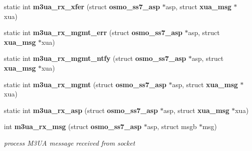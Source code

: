 \begin{DoxyCompactItemize}
\item 
static int {\bf m3ua\+\_\+rx\+\_\+xfer} (struct {\bf osmo\+\_\+ss7\+\_\+asp} $\ast$asp, struct {\bf xua\+\_\+msg} $\ast$xua)
\item 
static int {\bf m3ua\+\_\+rx\+\_\+mgmt\+\_\+err} (struct {\bf osmo\+\_\+ss7\+\_\+asp} $\ast$asp, struct {\bf xua\+\_\+msg} $\ast$xua)
\item 
static int {\bf m3ua\+\_\+rx\+\_\+mgmt\+\_\+ntfy} (struct {\bf osmo\+\_\+ss7\+\_\+asp} $\ast$asp, struct {\bf xua\+\_\+msg} $\ast$xua)
\item 
static int {\bf m3ua\+\_\+rx\+\_\+mgmt} (struct {\bf osmo\+\_\+ss7\+\_\+asp} $\ast$asp, struct {\bf xua\+\_\+msg} $\ast$xua)
\item 
static int {\bf m3ua\+\_\+rx\+\_\+asp} (struct {\bf osmo\+\_\+ss7\+\_\+asp} $\ast$asp, struct {\bf xua\+\_\+msg} $\ast$xua)
\item 
int {\bf m3ua\+\_\+rx\+\_\+msg} (struct {\bf osmo\+\_\+ss7\+\_\+asp} $\ast$asp, struct msgb $\ast$msg)
\begin{DoxyCompactList}\small\item\em process M3\+UA message received from socket \end{DoxyCompactList}\end{DoxyCompactItemize}
